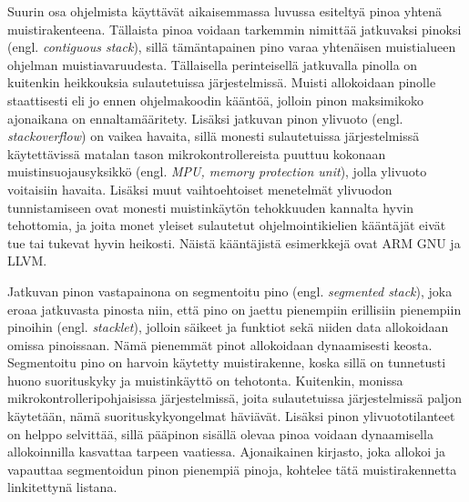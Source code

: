 Suurin osa ohjelmista käyttävät aikaisemmassa luvussa esiteltyä pinoa yhtenä muistirakenteena. Tällaista pinoa voidaan tarkemmin nimittää jatkuvaksi pinoksi (engl. \textit{contiguous stack}), sillä tämäntapainen pino varaa yhtenäisen muistialueen ohjelman muistiavaruudesta. Tällaisella perinteisellä jatkuvalla pinolla on kuitenkin heikkouksia sulautetuissa järjestelmissä. Muisti allokoidaan pinolle staattisesti eli jo ennen ohjelmakoodin kääntöä, jolloin pinon maksimikoko ajonaikana on ennaltamääritety. Lisäksi jatkuvan pinon ylivuoto (engl. \textit{stackoverflow}) on vaikea havaita, sillä monesti sulautetuissa järjestelmissä käytettävissä matalan tason mikrokontrollereista puuttuu kokonaan muistinsuojausyksikkö (engl. \textit{MPU, memory protection unit}), jolla ylivuoto voitaisiin havaita. Lisäksi muut vaihtoehtoiset menetelmät ylivuodon tunnistamiseen ovat monesti muistinkäytön tehokkuuden kannalta hyvin tehottomia, ja joita monet yleiset sulautetut ohjelmointikielien kääntäjät eivät tue tai tukevat hyvin heikosti. Näistä kääntäjistä esimerkkejä ovat ARM GNU ja LLVM.\cite{bsstes@2023}

Jatkuvan pinon vastapainona on segmentoitu pino (engl. \textit{segmented stack}), joka eroaa jatkuvasta pinosta niin, että pino on jaettu pienempiin erillisiin pienempiin pinoihin (engl. \textit{stacklet}), jolloin säikeet ja funktiot sekä niiden data allokoidaan omissa pinoissaan. Nämä pienemmät pinot allokoidaan dynaamisesti keosta. Segmentoitu pino on harvoin käytetty muistirakenne, koska sillä on tunnetusti huono suorituskyky ja muistinkäyttö on tehotonta. Kuitenkin, monissa mikrokontrolleripohjaisissa järjestelmissä, joita sulautetuissa järjestelmissä paljon käytetään, nämä suorituskykyongelmat häviävät. Lisäksi pinon ylivuototilanteet on helppo selvittää, sillä pääpinon sisällä olevaa pinoa voidaan dynaamisella allokoinnilla kasvattaa tarpeen vaatiessa. Ajonaikainen kirjasto, joka allokoi ja vapauttaa segmentoidun pinon pienempiä pinoja, kohtelee tätä muistirakennetta linkitettynä listana.\cite{bsstes@2023}


